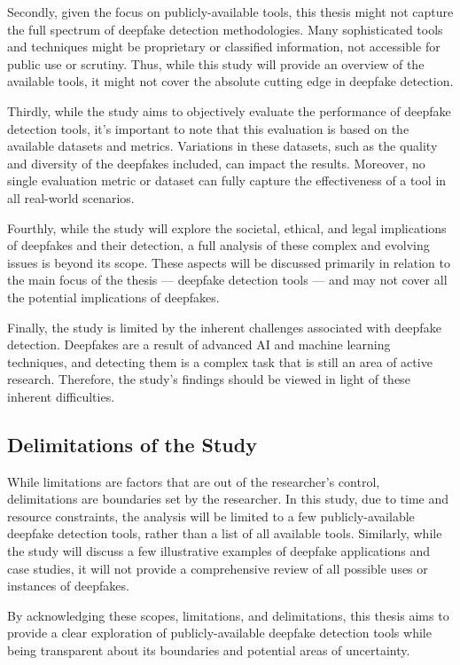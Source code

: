 Secondly, given the focus on publicly-available tools, this thesis might not capture
the full spectrum of deepfake detection methodologies. Many sophisticated tools and
techniques might be proprietary or classified information, not accessible for public
use or scrutiny. Thus, while this study will provide an overview of the
available tools, it might not cover the absolute cutting edge in deepfake detection.

Thirdly, while the study aims to objectively evaluate the performance of deepfake
detection tools, it's important to note that this evaluation is based on the
available datasets and metrics. Variations in these datasets, such as the quality
and diversity of the deepfakes included, can impact the results. Moreover, no
single evaluation metric or dataset can fully capture the effectiveness of a tool
in all real-world scenarios.

Fourthly, while the study will explore the societal, ethical, and legal implications
of deepfakes and their detection, a full analysis of these complex and
evolving issues is beyond its scope. These aspects will be discussed primarily in
relation to the main focus of the thesis --- deepfake detection tools --- and may not
cover all the potential implications of deepfakes.

Finally, the study is limited by the inherent challenges associated with deepfake
detection. Deepfakes are a result of advanced \ac{AI} and machine learning techniques,
and detecting them is a complex task that is still an area of active research.
Therefore, the study's findings should be viewed in light of these inherent difficulties.

\subsection{Delimitations of the Study}
While limitations are factors that are out of the researcher's control, delimitations
are boundaries set by the researcher. In this study, due to time and resource constraints,
the analysis will be limited to a few publicly-available deepfake detection tools,
rather than a list of all available tools. Similarly, while the study will discuss
a few illustrative examples of deepfake applications and case
studies, it will not provide a comprehensive review of all possible uses or instances
of deepfakes.

By acknowledging these scopes, limitations, and delimitations, this thesis aims to
provide a clear exploration of publicly-available deepfake detection tools while
being transparent about its boundaries and potential areas of uncertainty.
